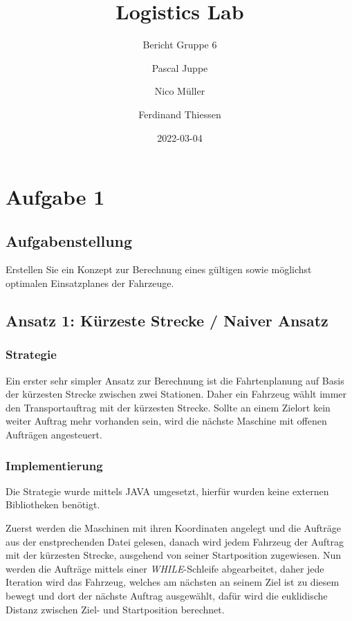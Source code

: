 \documentclass[ngerman]{tudscrreprt}
\begin{document}
\date{2022-03-04}
\author{%
Pascal Juppe%
%
\and%
Nico Müller%
%
\and%
Ferdinand Thiessen%
%
}
\title{Logistics Lab}
\subtitle{Bericht Gruppe 6}
\maketitle


\setcounter{tocdepth}{1}
\tableofcontents

\chapter{Aufgabe 1}
\section{Aufgabenstellung}
Erstellen Sie ein Konzept zur Berechnung eines gültigen sowie möglichst optimalen Einsatzplanes der Fahrzeuge.

\section{Ansatz 1: Kürzeste Strecke / Naiver Ansatz}
\subsection{Strategie}
Ein erster sehr simpler Ansatz zur Berechnung ist die Fahrtenplanung auf Basis
der kürzesten Strecke zwischen zwei Stationen.
Daher ein Fahrzeug wählt immer den Transportauftrag mit der kürzesten Strecke.
Sollte an einem Zielort kein weiter Auftrag mehr vorhanden sein, wird die nächste
Maschine mit offenen Aufträgen angesteuert.

\subsection{Implementierung}
Die Strategie wurde mittels JAVA umgesetzt, hierfür wurden keine externen
Bibliotheken benötigt.

Zuerst werden die Maschinen mit ihren Koordinaten angelegt und die Aufträge aus
der enstprechenden Datei gelesen, danach wird jedem Fahrzeug der Auftrag mit der kürzesten Strecke, ausgehend von seiner Startposition zugewiesen.
Nun werden die Aufträge mittels einer \emph{WHILE}-Schleife abgearbeitet,
daher jede Iteration wird das Fahrzeug, welches am nächsten an seinem Ziel ist zu diesem
bewegt und dort der nächste Auftrag ausgewählt, dafür wird die euklidische Distanz zwischen
Ziel- und Startposition berechnet.
\end{document}
